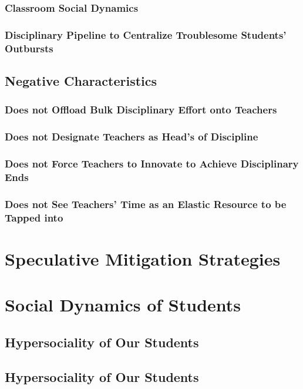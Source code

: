 \documentclass[12pt]{article}
\begin{document}
	\subsubsection{Classroom Social Dynamics}
	\subsubsection{Disciplinary Pipeline to Centralize Troublesome Students' Outbursts}
	\subsection{Negative Characteristics}
	\subsubsection{Does not Offload Bulk Disciplinary Effort onto Teachers}
	\subsubsection{Does not Designate Teachers as Head's of Discipline}
	\subsubsection{Does not Force Teachers to Innovate to Achieve Disciplinary Ends}
	\subsubsection{Does not See Teachers' Time as an Elastic Resource to be Tapped into}
	
	\section{Speculative Mitigation Strategies}
	
	\section{Social Dynamics of Students}
	\subsection{Hypersociality of Our Students}
	\subsection{Hypersociality of Our Students}
\end{document}
